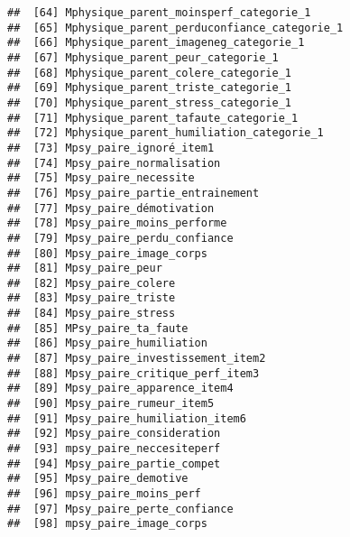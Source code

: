 \documentclass[
]{article}
\begin{document}
\begin{verbatim}
##  [64] Mphysique_parent_moinsperf_categorie_1                           
##  [65] Mphysique_parent_perduconfiance_categorie_1                      
##  [66] Mphysique_parent_imageneg_categorie_1                            
##  [67] Mphysique_parent_peur_categorie_1                                
##  [68] Mphysique_parent_colere_categorie_1                              
##  [69] Mphysique_parent_triste_categorie_1                              
##  [70] Mphysique_parent_stress_categorie_1                              
##  [71] Mphysique_parent_tafaute_categorie_1                             
##  [72] Mphysique_parent_humiliation_categorie_1                         
##  [73] Mpsy_paire_ignoré_item1                                          
##  [74] Mpsy_paire_normalisation                                         
##  [75] Mpsy_paire_necessite                                             
##  [76] Mpsy_paire_partie_entrainement                                   
##  [77] Mpsy_paire_démotivation                                          
##  [78] Mpsy_paire_moins_performe                                        
##  [79] Mpsy_paire_perdu_confiance                                       
##  [80] Mpsy_paire_image_corps                                           
##  [81] Mpsy_paire_peur                                                  
##  [82] Mpsy_paire_colere                                                
##  [83] Mpsy_paire_triste                                                
##  [84] Mpsy_paire_stress                                                
##  [85] MPsy_paire_ta_faute                                              
##  [86] Mpsy_paire_humiliation                                           
##  [87] Mpsy_paire_investissement_item2                                  
##  [88] Mpsy_paire_critique_perf_item3                                   
##  [89] Mpsy_paire_apparence_item4                                       
##  [90] Mpsy_paire_rumeur_item5                                          
##  [91] Mpsy_paire_humiliation_item6                                     
##  [92] Mpsy_paire_consideration                                         
##  [93] mpsy_paire_neccesiteperf                                         
##  [94] Mpsy_paire_partie_compet                                         
##  [95] Mpsy_paire_demotive                                              
##  [96] mpsy_paire_moins_perf                                            
##  [97] Mpsy_paire_perte_confiance                                       
##  [98] mpsy_paire_image_corps                                           

\end{verbatim}
\end{document}
